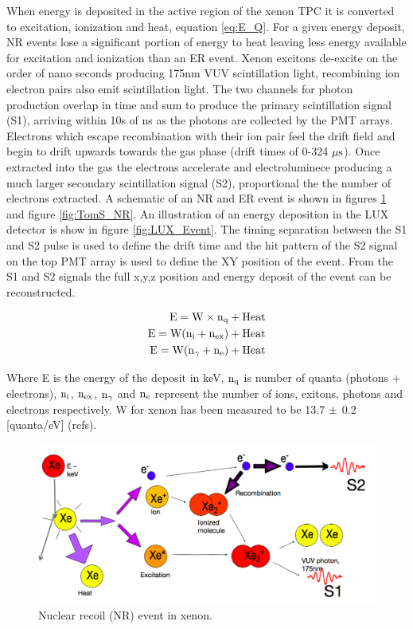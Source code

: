 When energy is deposited in the active region of the xenon TPC it is converted to excitation, ionization and heat, equation \ref{eq:E_Q}. For a given energy deposit, NR events lose a significant portion of energy to heat leaving less energy available for excitation and ionization than an ER event. Xenon excitons de-excite on the order of nano seconds producing 175nm VUV scintillation light, recombining ion electron pairs also emit scintillation light. The two channels for photon production overlap in time and sum to produce the primary scintillation signal (S1), arriving within 10s of ns as the photons are collected by the  PMT arrays. Electrons which escape recombination with their ion pair feel the drift field and begin to drift upwards towards the gas phase (drift times of 0-324 $\rm \mu s$). Once extracted into the gas the electrons accelerate and electroluminece  producing a much larger secondary scintillation signal (S2), proportional the the number of electrons extracted. A schematic of an NR and ER event is shown in figures \ref{fig:TomS_ER} and figure \ref{fig:TomS_NR}. An illustration of an energy deposition in the LUX detector is show in figure \ref{fig:LUX_Event}. The timing separation between the S1 and S2 pulse is used to define the drift time and the hit pattern of the S2 signal on the top PMT array is used to define the XY position of the event. From the S1 and S2 signals the full x,y,z position and energy deposit of the event can be reconstructed.



\begin{equation}
\begin{split}
\rm E= W\times n_q + Heat \\
\rm E= W (n_i + n_{ex}) + Heat \\
\rm E= W (n_\gamma + n_e) + Heat \\
\label{eq:E_Q}
\end{split}
\end{equation}

Where E is the energy of the deposit in keV, $\rm n_q$ is number of quanta (photons + electrons), $\rm n_i$, $\rm n_{ex}$, $\rm n_\gamma$ and $\rm n_e$ represent the number of ions, exitons, photons and electrons respectively. W for xenon has been measured to be 13.7 $\rm \pm$ 0.2  [quanta/eV] (refs).

 \begin{figure}[h!]\centering
 \includegraphics[width=150mm]{Chapter_LUX_Det/NR_T_Shutt.png}
\caption{Nuclear recoil (NR) event in xenon.}
\label{fig:TomS_ER}
\end{figure}

